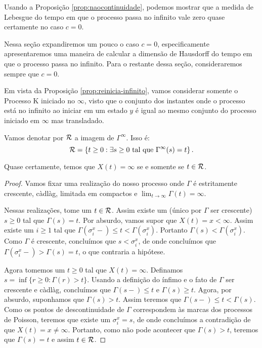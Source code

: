 Usando a Proposição \ref{prop:naocontinuidade}, podemos mostrar que a
medida de Lebesgue do tempo em que o processo passa no infinito vale
zero quase certamente no caso $c = 0$.

Nessa seção expandiremos um pouco o caso $c = 0$, especificamente
apresentaremos uma maneira de calcular a dimensão de Hausdorff do
tempo em que o processo passa no infinito.  Para o restante dessa
seção, consideraremos sempre que $c = 0$.

Em vista da Proposição \ref{prop:reinicia-infinito}, vamos considerar
somente o Processo K iniciado no $\infty$, visto que o conjunto dos
instantes onde o processo está no infinito ao iniciar em um estado $y$
é igual ao mesmo conjunto do processo iniciado em $\infty$ mas
transladado.

\begin{definicao}
  Vamos denotar por ${\mathcal{R}}$ a imagem de $\Gamma^\infty$. Isso é:
  \begin{displaymath}
    {\mathcal{R}} = \left\{
      t \geq 0 : \exists s \geq 0 \textrm{ tal que } \Gamma^\infty(s) = t
    \right\}.
  \end{displaymath}
\end{definicao}

\begin{proposicao}
  Quase certamente, temos que $X(t) = \infty$ se e somente se $t \in {\mathcal{R}}$.
\end{proposicao}
\begin{proof}
  Vamos fixar uma realização do nosso processo onde $\Gamma$ é
  estritamente crescente, càdlàg, limitada em compactos e $\lim_{t \to
    \infty} \Gamma(t) = \infty$.

  Nessas realizações, tome um $t \in {\mathcal{R}}$. Assim existe um (único por
  $\Gamma$ ser crescente) $s \geq 0$ tal que $\Gamma(s) = t$. Por
  absurdo, vamos supor que $X(t) = x < \infty$. Assim existe um $i
  \geq 1$ tal que $\Gamma(\sigma_i^x -) \leq t <
  \Gamma(\sigma_i^x)$. Portanto $\Gamma(s) < \Gamma(\sigma_i^x)$. Como
  $\Gamma$ é crescente, concluímos que $s < \sigma_i^x$, de onde
  concluímos que $\Gamma(\sigma_i^x-) > \Gamma(s) = t$, o que
  contraria a hipótese.

  Agora tomemos um $t \geq 0$ tal que $X(t) = \infty$. Definamos $s =
  \inf \{ r \geq 0 : \Gamma(r) > t \}$. Usando a definição do ínfimo e
  o fato de $\Gamma$ ser crescente e càdlàg, concluímos que
  $\Gamma(s-) \leq t$ e $\Gamma(s) \geq t$. Agora, por absurdo,
  suponhamos que $\Gamma(s) > t$. Assim teremos que $\Gamma(s-) \leq t
  < \Gamma(s)$. Como os pontos de descontinuidade de $\Gamma$
  correspondem às marcas dos processos de Poisson, teremos que existe
  um $\sigma_i^x = s$, de onde concluímos a contradição de que $X(t) =
  x \neq \infty$. Portanto, como não pode acontecer que $\Gamma(s) >
  t$, teremos que $\Gamma(s) = t$ e assim $t \in {\mathcal{R}}$.
\end{proof}

